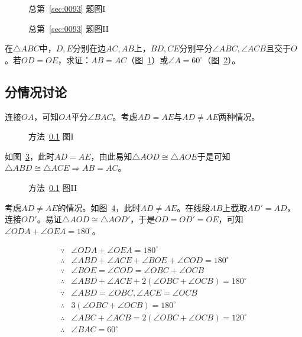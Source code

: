 

\begin{figure}[htbp]
  \centering {}
  \caption{总第~\ref{sec:0093} 题图I} \label{fig:0093-1}
\end{figure}

\begin{figure}[htbp]
  \centering {}
  \caption{总第~\ref{sec:0093} 题图II} \label{fig:0093-2}
\end{figure}

在$\triangle ABC$中，$D, E$分别在边$AC, AB$上，$BD, CE$分别平分$\angle ABC, \angle ACB$且交于$O$。若$OD = OE$，求证：$AB = AC$（图~\ref{fig:0093-1}）或$\angle A = 60^\circ$（图~\ref{fig:0093-2}）。

\subsection{分情况讨论} \label{subsec:0093-sit}

连接$OA$，可知$OA$平分$\angle BAC$。考虑$AD = AE$与$AD \ne AE$两种情况。

\begin{figure}[htbp]
  \centering {}
  \caption{方法~\ref{subsec:0093-sit} 图I} \label{fig:0093-sit1}
\end{figure}

如图~\ref{fig:0093-sit1}，此时$AD = AE$，由此易知$\triangle AOD \cong \triangle AOE$于是可知$\triangle ABD \cong \triangle ACE \Rightarrow AB = AC$。

\begin{figure}[htbp]
  \centering {}
  \caption{方法~\ref{subsec:0093-sit} 图II} \label{fig:0093-sit2}
\end{figure}

考虑$AD \ne AE$的情况。如图~\ref{fig:0093-sit2}，此时$AD \ne AE$。在线段$AB$上截取$AD' = AD$，连接$OD'$。易证$\triangle AOD \cong \triangle AOD'$，于是$OD = OD' = OE$，可知$\angle ODA + \angle OEA = 180^\circ$。

\begin{align*}
  \because  {}& \angle ODA + \angle OEA = 180^\circ \\
  \therefore{}& \angle ABD + \angle ACE + \angle BOE + \angle COD = 180^\circ \\
  \because  {}& \angle BOE = \angle COD = \angle OBC + \angle OCB \\
  \therefore{}& \angle ABD + \angle ACE + 2(\angle OBC + \angle OCB) = 180^\circ \\
  \because  {}& \angle ABD = \angle OBC, \angle ACE = \angle OCB \\
  \therefore{}& 3(\angle OBC + \angle OCB) = 180^\circ \\
  \therefore{}& \angle ABC + \angle ACB = 2(\angle OBC + \angle OCB) = 120^\circ \\
  \therefore{}& \angle BAC = 60^\circ
\end{align*}


